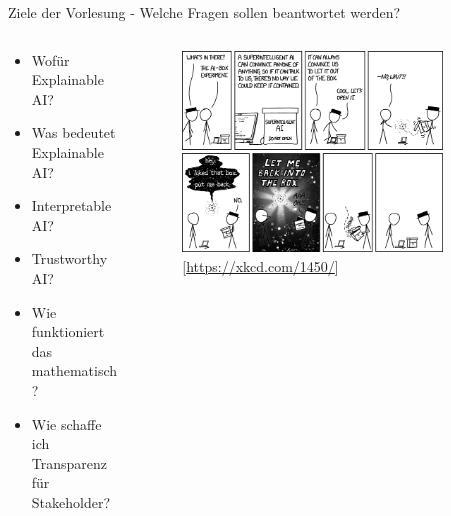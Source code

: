 \documentclass[aspectratio=1610, xcolor=dvipsnames, 9pt]{beamer}
\begin{document}
\begin{frame}{Ziele der Vorlesung - Welche Fragen sollen beantwortet werden?}
  \begin{columns}
    \begin{column}{0.49\textwidth}
      \begin{itemize}
        \item Wofür Explainable AI? \newline
        \item Was bedeutet Explainable AI? \newline
        \item Interpretable AI?  \newline
        \item Trustworthy AI? \newline
        \item Wie funktioniert das mathematisch? \newline
        \item Wie schaffe ich Transparenz für Stakeholder?
      \end{itemize}
    \end{column}
    \begin{column}{0.5\textwidth}
 \begin{figure}
 \centering
             \includegraphics[width=0.9\textwidth]{images/ai_box_experiment.png}
             [\url{https://xkcd.com/1450/}]
 \end{figure}
    \end{column}
  \end{columns}
\end{frame}
\end{document}
